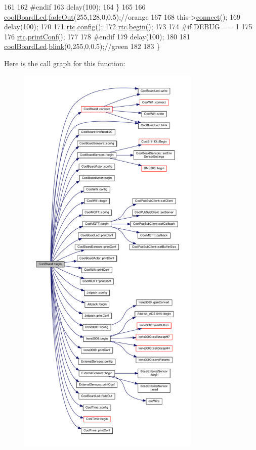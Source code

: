 \begin{DoxyCode}
161 
162 \textcolor{preprocessor}{    #endif}
163         delay(100);
164     \}
165     
166     \hyperlink{class_cool_board_a1b1d3c684a5baa56b08486e192fd8e97}{coolBoardLed}.\hyperlink{class_cool_board_led_a93d545679237e8cc858324367149775c}{fadeOut}(255,128,0,0.5);\textcolor{comment}{//orange}
167 
168     this->\hyperlink{class_cool_board_a519de78b807f8ec6463ff484eb925918}{connect}();
169     delay(100);
170 
171     \hyperlink{class_cool_board_a50d2a6716879d64a85f3c6b44ad63275}{rtc}.\hyperlink{class_cool_time_a87c28260c1bc77091162cbcf1ee2e129}{config}();
172     \hyperlink{class_cool_board_a50d2a6716879d64a85f3c6b44ad63275}{rtc}.\hyperlink{class_cool_time_ab1976cf718b950bc31e003c3323b8adb}{begin}();
173 
174 \textcolor{preprocessor}{#if DEBUG == 1}
175 
176     \hyperlink{class_cool_board_a50d2a6716879d64a85f3c6b44ad63275}{rtc}.\hyperlink{class_cool_time_af355e7f9b3898211cd2ff25eab5933b1}{printConf}();
177 
178 \textcolor{preprocessor}{#endif}
179     delay(100);
180     
181     \hyperlink{class_cool_board_a1b1d3c684a5baa56b08486e192fd8e97}{coolBoardLed}.\hyperlink{class_cool_board_led_a96e1ea13003eee34c9dbcef340404426}{blink}(0,255,0,0.5);\textcolor{comment}{//green}
182 
183 \}
\end{DoxyCode}
Here is the call graph for this function\+:\nopagebreak
\begin{figure}[H]
\begin{center}
\leavevmode
\includegraphics[height=550pt]{d7/df9/class_cool_board_acba7c5aef7268b2c0044bdb54d3b9d76_cgraph}
\end{center}
\end{figure}
